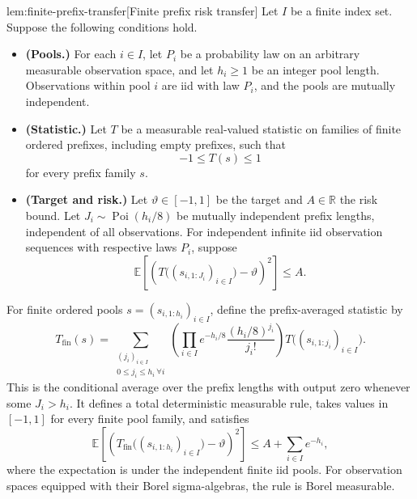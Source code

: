 \documentclass[11pt]{article}
\begin{document}
\begin{lemmav}{lem:finite-prefix-transfer}[Finite prefix risk transfer]
Let \(I\) be a finite index set. Suppose the following conditions hold.
\begin{itemize}
\item \textbf{(Pools.)} For each \(i\in I\), let \(P_i\) be a probability law on an arbitrary measurable observation space, and let \(h_i\geq 1\) be an integer pool length. Observations within pool \(i\) are iid with law \(P_i\), and the pools are mutually independent.
\item \textbf{(Statistic.)} Let \(T\) be a measurable real-valued statistic on families of finite ordered prefixes, including empty prefixes, such that
\[
-1\leq T(s)\leq 1
\]
for every prefix family \(s\).
\item \textbf{(Target and risk.)} Let \(\vartheta\in[-1,1]\) be the target and \(A\in\mathbb R\) the risk bound. Let \(J_i\sim\operatorname{Poi}(h_i/8)\) be mutually independent prefix lengths, independent of all observations. For independent infinite iid observation sequences with respective laws \(P_i\), suppose
\[
\mathbb E\!\left[
\left(T\bigl((s_{i,1:J_i})_{i\in I}\bigr)-\vartheta\right)^2
\right]\leq A.
\]
\end{itemize}
For finite ordered pools \(s=(s_{i,1:h_i})_{i\in I}\), define the prefix-averaged statistic by
\[
T_{\mathrm{fin}}(s)
=
\sum_{\substack{(j_i)_{i\in I}\\0\leq j_i\leq h_i\ \forall i}}
\left(
\prod_{i\in I}
e^{-h_i/8}\frac{(h_i/8)^{j_i}}{j_i!}
\right)
T\bigl((s_{i,1:j_i})_{i\in I}\bigr).
\]
This is the conditional average over the prefix lengths with output zero whenever some \(J_i>h_i\). It defines a total deterministic measurable rule, takes values in \([-1,1]\) for every finite pool family, and satisfies
\[
\mathbb E\!\left[
\left(T_{\mathrm{fin}}\bigl((s_{i,1:h_i})_{i\in I}\bigr)
-\vartheta\right)^2
\right]
\leq A+\sum_{i\in I}e^{-h_i},
\]
where the expectation is under the independent finite iid pools. For observation spaces equipped with their Borel sigma-algebras, the rule is Borel measurable.
\end{lemmav}
\end{document}
